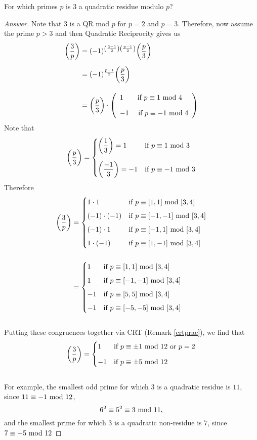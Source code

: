 \vspace*{1em}

\begin{example}
For which primes $p$ is $3$ a quadratic residue modulo $p$?
\end{example}
\begin{proof}[Answer]
Note that $3$ is a QR mod $p$ for $p = 2$ and $p =3$. Therefore, now assume the prime $p > 3$ and then Quadratic Reciprocity gives us
\begin{align*}
\bigg(\dfrac{3}{p}\bigg) &= (-1)^{\left(\frac{3-1}{2}\right)\left(\frac{p-1}{2}\right)}\bigg(\dfrac{p}{3}\bigg)\\[0.5em]
&= (-1)^{\frac{p-1}{2}}\bigg(\dfrac{p}{3}\bigg)\\[1em]
&= \bigg(\dfrac{p}{3}\bigg)\cdot\left(\begin{array}{l}
1 \qquad \text{if } p \equiv 1 \text{ mod }{4}\\[1em]
-1 \quad\ \ \!\!\text{if } p \equiv -1 \text{ mod }{4}
\end{array} \right)
\end{align*}
Note that
\[\bigg(\dfrac{p}{3}\bigg) = \begin{cases} \bigg(\dfrac{1}{3}\bigg) = 1 & \text{if } p \equiv 1 \text{ mod }{3}\\[1.5em]
 \bigg(\dfrac{-1}{3}\bigg) = -1 & \text{if } p \equiv -1 \text{ mod }{3}\end{cases}\]
Therefore
\begin{align*}
\bigg(\dfrac{3}{p}\bigg) &= \begin{cases}
1\cdot 1 & \text{if } p \equiv [1,1] \text{ mod }{[3,4]}\\[0.5em]
(-1)\cdot (-1) & \text{if } p \equiv [-1,-1] \text{ mod }{[3,4]}\\[0.5em]
(-1)\cdot 1 & \text{if } p \equiv [-1,1] \text{ mod }{[3,4]}\\[0.5em]
1\cdot (-1) & \text{if } p \equiv [1,-1] \text{ mod }{[3,4]}
\end{cases}\\[1.5em]
&= \begin{cases}
1 & \text{if } p \equiv [1,1] \text{ mod }{[3,4]}\\[0.5em]
1 & \text{if } p \equiv [-1,-1] \text{ mod }{[3,4]}\\[0.5em]
-1 & \text{if } p \equiv [5,5] \text{ mod }{[3,4]}\\[0.5em]
-1 & \text{if } p \equiv [-5,-5] \text{ mod }{[3,4]}
\end{cases}
\end{align*}
\vspace{0.1in}\\
Putting these congruences together via CRT (Remark \ref{crtprac}), we find that\\
\[\bigg(\dfrac{3}{p}\bigg) = \begin{cases} 1 & \text{if } p \equiv \pm 1 \text{ mod }{12} \text{ or } p=2\\[0.75em]
-1 & \text{if } p \equiv \pm 5 \text{ mod }{12}\end{cases}\]\\
For example, the smallest odd prime for which $3$ is a quadratic residue is $11$, since $11 \equiv -1 \text{ mod }{12}$,
\[6^2\equiv 5^2 \equiv 3 \text{ mod }{11},\]
and the smallest prime for which $3$ is a quadratic non-residue is $7$, since $7 \equiv -5 \text{ mod }{12}$
\end{proof}

